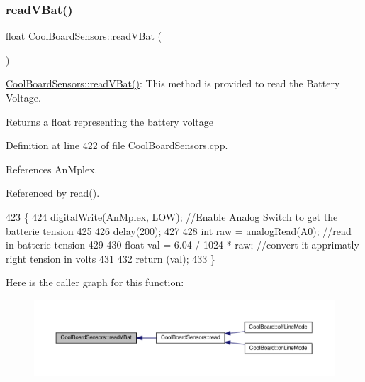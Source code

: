 \subsubsection{\texorpdfstring{read\+V\+Bat()}{readVBat()}}
{\footnotesize\ttfamily float Cool\+Board\+Sensors\+::read\+V\+Bat (\begin{DoxyParamCaption}{ }\end{DoxyParamCaption})}

\hyperlink{classCoolBoardSensors_a6944b6ea7bce8e2fce1b434acfd9d5f3}{Cool\+Board\+Sensors\+::read\+V\+Bat()}\+: This method is provided to read the Battery Voltage.

\begin{DoxyReturn}{Returns}
a float representing the battery voltage 
\end{DoxyReturn}


Definition at line 422 of file Cool\+Board\+Sensors.\+cpp.



References An\+Mplex.



Referenced by read().


\begin{DoxyCode}
423 \{
424     digitalWrite(\hyperlink{classCoolBoardSensors_a12ef28b1046219e0aee10bf64e28c4a5}{AnMplex}, LOW);                                  \textcolor{comment}{//Enable Analog Switch to get the
       batterie tension}
425     
426     delay(200);
427     
428     \textcolor{keywordtype}{int} raw = analogRead(A0);                                    \textcolor{comment}{//read in batterie tension}
429     
430     \textcolor{keywordtype}{float} val = 6.04 / 1024 * raw;                               \textcolor{comment}{//convert it apprimatly right tension in
       volts}
431 
432     \textcolor{keywordflow}{return} (val);   
433 \}
\end{DoxyCode}
Here is the caller graph for this function\+:
\nopagebreak
\begin{figure}[H]
\begin{center}
\leavevmode
\includegraphics[width=350pt]{classCoolBoardSensors_a6944b6ea7bce8e2fce1b434acfd9d5f3_icgraph}
\end{center}
\end{figure}
\mbox{\label{classCoolBoardSensors_a406307ffd70272282d91479c7ed8d66f}} 
